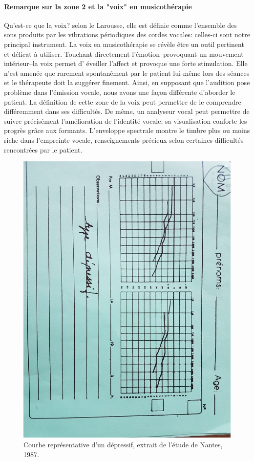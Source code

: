 \begin{enumerate}
 \paragraph{Remarque sur la zone 2 et la "voix" en musicothérapie}
Qu'est-ce que la voix? selon le Larousse, elle est définie comme
l'ensemble des sons produits par les vibrations périodiques des
cordes vocales: celles-ci sont notre principal instrument.
La voix en musicothérapie se révèle être un outil pertinent et délicat
à utiliser. Touchant 
directement 
l'émotion--provoquant un mouvement intérieur--la voix permet d'
éveiller l'affect
et provoque une forte stimulation. Elle n'est amenée que rarement
spontanément par le patient lui-même lors des séances et le thérapeute doit la suggérer
finement.
Ainsi, en supposant que l'audition pose problème dans l'émission
vocale, nous avons une façon différente d'aborder le patient. La
définition de cette
zone de la voix peut permettre de le comprendre différemment dans ses difficultés. 
De même, un analyseur vocal peut permettre de suivre précisément l'amélioration de
l'identité vocale; sa visualisation conforte les progrès grâce aux
formants. L'enveloppe spectrale montre le timbre plus ou moins riche
dans l'empreinte vocale, renseignements précieux selon certaines
difficultés rencontrées par le patient.
  \begin{figure}
	\centering
	\includegraphics[width=0.7\linewidth]{images/courbedepressif.jpg}
	\caption[Exemple d'une courbe de dépressif]{Courbe
          représentative d'un dépressif, extrait de l'étude de Nantes,
         1987.}
       

\end{figure}
\end{enumerate}
